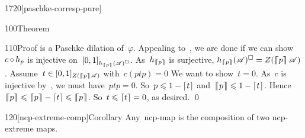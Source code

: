 \begin{parsec}{1720}[paschke-corresp-pure]
\begin{point}{100}{Theorem}
\begin{point}{110}{Proof}
    is a Paschke dilation of~$\varphi$.
Appealing to~,
    we are done if we can show~$c \mathop{\circ} h_p$
    is injective on~$[0,1]_{h_{\left\lceil\!\!\left\lceil p\right\rceil\!\!\right\rceil}(\mathscr{A})^\square}$.
As~$h_{\left\lceil\!\!\left\lceil p\right\rceil\!\!\right\rceil}$ is surjective,
    $h_{\cceil{p}}(\scrA)^\square = Z(\cceil{p} \scrA)$.
    Assume~$t \in [0,1]_{Z(\left\lceil\!\!\left\lceil p\right\rceil\!\!\right\rceil \mathscr{A})}$ with~$c(ptp)=0$
We want to show~$t = 0$.
As~$c$ is injective by~,
        we must have~$ptp = 0$.
So~$p \leqslant 1- \left\lceil t\right\rceil$
and~$\left\lceil\!\!\left\lceil p\right\rceil\!\!\right\rceil \leqslant 1- \left\lceil t\right\rceil$.
Hence~$\cceil{p} \leq \cceil{p} - \ceil{t} \leq \cceil{p}$.
So~$t \leqslant \left\lceil t \right\rceil=0$, as desired. \qed
\end{point}
\end{point}
\begin{point}{120}[ncp-extreme-comp]{Corollary}%
    Any~ncp-map is the composition of two ncp-extreme maps.
\end{point}
\end{parsec}


